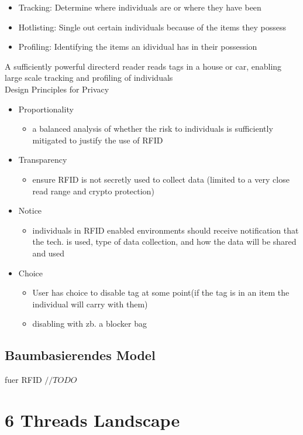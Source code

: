 \documentclass[a4paper, 12pt]{article}
\begin{document}
\begin{itemize}
\item Tracking: Determine where individuals are or where they have been
\item Hotlisting: Single out certain individuals because of the items they possess
\item Profiling: Identifying the items an idividual has in their possession
\end{itemize}
A sufficiently powerful directerd reader reads tags in a house or car, enabling large scale tracking and profiling of individuals \\ \newline
\newbox
\large Design Principles for Privacy
\begin{itemize}
\item Proportionality
\begin{itemize}
\item a balanced analysis of whether the risk to individuals is sufficiently mitigated to justify the use of RFID
\end{itemize}
\item Transparency
\begin{itemize}
\item ensure RFID is not secretly used to collect data (limited to a very close read range and crypto protection)
\end{itemize}
\item Notice
\begin{itemize}
\item individuals in RFID enabled environments should receive notification that the tech. is used, type of data collection, and how the data will be shared and used
\end{itemize}
\item Choice
\begin{itemize}
\item User has choice to disable tag at some point(if the tag is in an item the individual will carry with them)
\item disabling with zb. a blocker bag
\end{itemize}
\end{itemize}


\subsection{Baumbasierendes Model}
fuer RFID
$ //TODO $


\section{6 Threads Landscape}
\end{document}
